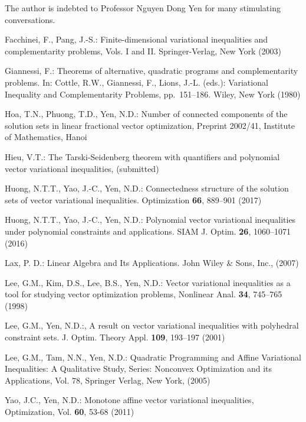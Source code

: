\documentclass[smallextended,envcountsect]{svjour3}       %
\begin{document}
\begin{acknowledgements}
	The author is indebted to Professor Nguyen Dong Yen for many stimulating conversations.
\end{acknowledgements}
\begin{thebibliography}{99}
	
 Facchinei, F., Pang, J.-S.: Finite-dimensional variational inequalities and complementarity problems, {Vols. I and II.} {Springer-Verlag, New York (2003)}

  {Giannessi, F.:} Theorems of alternative, quadratic programs and complementarity problems. {In: Cottle, R.W., Giannessi, F., Lions, J.-L. (eds.): Variational Inequality and Complementarity Problems, pp.~151--186.} {Wiley, New York (1980)}

 Hoa, T.N., Phuong, T.D., Yen, N.D.: Number of connected components of the solution sets in linear fractional vector optimization, Preprint 2002/41, Institute of Mathematics, Hanoi

  {Hieu, V.T.:} The Tarski-Seidenberg theorem with quantifiers and
polynomial vector variational inequalities, {(submitted)}

 {Huong, N.T.T., Yao, J.-C., Yen, N.D.:} Connectedness structure of the solution sets of vector variational inequalities. Optimization  \textbf{66}, 889--901 (2017)

 {Huong, N.T.T., Yao, J.-C., Yen, N.D.:} {Polynomial vector variational inequalities under polynomial constraints and applications}. {SIAM J. Optim. \textbf{26}, 1060--1071 (2016)}

 {Lax, P. D.:} Linear Algebra and Its Applications. {John Wiley \& Sons, Inc., (2007)}

 Lee, G.M., Kim, D.S., Lee, B.S., Yen, N.D.: Vector variational inequalities as a tool for studying vector	optimization problems, Nonlinear Anal. {\bf 34}, 745--765 (1998)

 Lee, G.M., Yen, N.D.:, {A result on vector variational inequalities with polyhedral constraint sets}. {J. Optim. Theory Appl.} {{\textbf{109}}, 193--197 (2001)}

 Lee, G.M., Tam, N.N., Yen, N.D.: Quadratic
Programming and Affine Variational Inequalities: A Qualitative
Study, Series: Nonconvex Optimization and its Applications, Vol.
78,  Springer Verlag, New York, (2005)


 Yao, J.C.,  Yen, N.D.: Monotone affine vector variational inequalities,  Optimization, Vol. \textbf{60}, 53-68 (2011)


\end{thebibliography}
\end{document}
